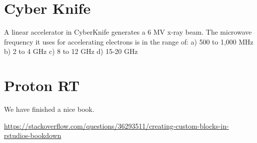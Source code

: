 \documentclass[]{book}
\theoremstyle{definition}
\theoremstyle{definition}
\theoremstyle{definition}
\theoremstyle{remark}
\begin{document}
\chapter{Cyber Knife}\label{cyber-knife}

A linear accelerator in CyberKnife generates a 6 MV x-ray beam. The
microwave frequency it uses for accelerating electrons is in the range
of: a) 500 to 1,000 MHz b) 2 to 4 GHz c) 8 to 12 GHz d) 15-20 GHz

\chapter{Proton RT}\label{proton}

We have finished a nice book.

\url{https://stackoverflow.com/questions/36293511/creating-custom-blocks-in-rstudios-bookdown}


\end{document}
